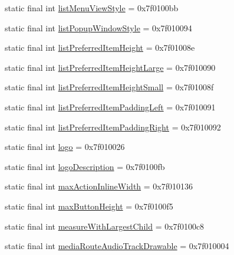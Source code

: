 \begin{CompactItemize}
\item 
static final int \hyperlink{classandroid_1_1support_1_1v7_1_1mediarouter_1_1_r_1_1attr_49069b667a24a30d45fa625669a722d0}{listMenuViewStyle} = 0x7f0100bb
\item 
static final int \hyperlink{classandroid_1_1support_1_1v7_1_1mediarouter_1_1_r_1_1attr_b7fc037f5ce6f089aaeedd6d6b7236bf}{listPopupWindowStyle} = 0x7f010094
\item 
static final int \hyperlink{classandroid_1_1support_1_1v7_1_1mediarouter_1_1_r_1_1attr_5fd7f13c7d7328e49962eac38307904a}{listPreferredItemHeight} = 0x7f01008e
\item 
static final int \hyperlink{classandroid_1_1support_1_1v7_1_1mediarouter_1_1_r_1_1attr_6f4fd369e01ea45989ba6ca4e1e3094f}{listPreferredItemHeightLarge} = 0x7f010090
\item 
static final int \hyperlink{classandroid_1_1support_1_1v7_1_1mediarouter_1_1_r_1_1attr_5ac2ae0b3b03b3b454f67affebbd15c7}{listPreferredItemHeightSmall} = 0x7f01008f
\item 
static final int \hyperlink{classandroid_1_1support_1_1v7_1_1mediarouter_1_1_r_1_1attr_93e9ece80b6571e4c3b6161b4764bfb7}{listPreferredItemPaddingLeft} = 0x7f010091
\item 
static final int \hyperlink{classandroid_1_1support_1_1v7_1_1mediarouter_1_1_r_1_1attr_b55612a59efa725fbb40f0274cd1f8a1}{listPreferredItemPaddingRight} = 0x7f010092
\item 
static final int \hyperlink{classandroid_1_1support_1_1v7_1_1mediarouter_1_1_r_1_1attr_fafc68ea72e118080a57bcb2e2e65e45}{logo} = 0x7f010026
\item 
static final int \hyperlink{classandroid_1_1support_1_1v7_1_1mediarouter_1_1_r_1_1attr_d76b3e9e07abbe2a0948f7737fa475d5}{logoDescription} = 0x7f0100fb
\item 
static final int \hyperlink{classandroid_1_1support_1_1v7_1_1mediarouter_1_1_r_1_1attr_080ed760e3631b305c439704c1bbe20c}{maxActionInlineWidth} = 0x7f010136
\item 
static final int \hyperlink{classandroid_1_1support_1_1v7_1_1mediarouter_1_1_r_1_1attr_ee876b6164fb3f4650dae32be9083ca3}{maxButtonHeight} = 0x7f0100f5
\item 
static final int \hyperlink{classandroid_1_1support_1_1v7_1_1mediarouter_1_1_r_1_1attr_c3a1ee928352fa0b12b84127f2b21c6f}{measureWithLargestChild} = 0x7f0100c8
\item 
static final int \hyperlink{classandroid_1_1support_1_1v7_1_1mediarouter_1_1_r_1_1attr_530a3f6ab74b93207943412e621cc73e}{mediaRouteAudioTrackDrawable} = 0x7f010004

\end{CompactItemize}
